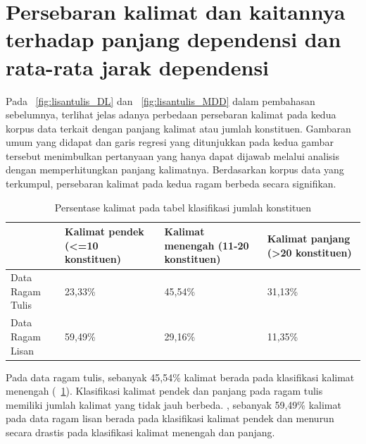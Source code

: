 \section{Persebaran kalimat dan kaitannya terhadap panjang dependensi dan rata-rata jarak dependensi}

Pada \pic~\ref{fig:lisantulis_DL}  dan \pic~\ref{fig:lisantulis_MDD} dalam pembahasan sebelumnya, terlihat jelas adanya perbedaan persebaran kalimat pada kedua korpus data terkait dengan panjang kalimat atau jumlah konstituen. Gambaran umum yang didapat dan garis regresi yang ditunjukkan pada kedua gambar tersebut menimbulkan pertanyaan yang hanya dapat dijawab melalui analisis dengan memperhitungkan panjang kalimatnya. Berdasarkan korpus data yang terkumpul, persebaran kalimat pada kedua ragam berbeda secara signifikan. 

\begin{table}
\begin{center}
\begin{small}
   \caption{Persentase kalimat pada tabel klasifikasi jumlah konstituen}  \label{tab:presentase_kalimat}
  \begin{tabular}{ |p{3cm} | p{3cm} | p{3cm} | p{3cm} |}
    \hline
 & Kalimat pendek \newline (\textless=10 konstituen) & Kalimat menengah (11-20 konstituen) & Kalimat panjang (\textgreater20 konstituen) \\ \hline
Data Ragam Tulis & 23,33\% & 45,54\% & 31,13\% \\ \hline
Data Ragam Lisan & 59,49\% & 29,16\% & 11,35\% \\ \hline
  \end{tabular}
  \end{small}
\end{center}
\end{table}

Pada data ragam tulis, sebanyak 45,54\% kalimat berada pada klasifikasi kalimat menengah (\tab~\ref{tab:presentase_kalimat}). Klasifikasi kalimat pendek dan panjang pada ragam tulis memiliki jumlah kalimat yang tidak jauh berbeda. , sebanyak 59,49\% kalimat pada data ragam lisan berada pada klasifikasi kalimat pendek dan menurun secara drastis pada klasifikasi kalimat menengah dan panjang.  


